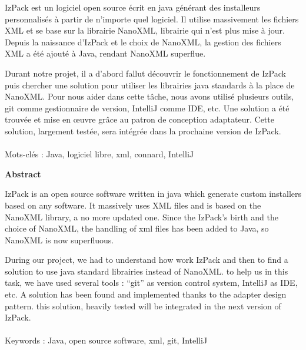 IzPack est un logiciel open source écrit en java générant des installeurs personnalisés à partir de n'importe quel logiciel.
Il utilise massivement les fichiers XML et se base sur la librairie NanoXML, librairie qui n'est plus mise à jour.
Depuis la naissance d'IzPack et le choix de NanoXML, la gestion des fichiers XML a été ajouté à Java, rendant NanoXML superflue.

Durant notre projet, il a d'abord fallut découvrir le fonctionnement de IzPack puis chercher une solution pour utiliser les librairies java standards à la place de NanoXML.
Pour nous aider dans cette tâche, nous avons utilisé plusieurs outils, git comme gestionnaire de version, IntelliJ comme IDE, etc.
Une solution a été trouvée et mise en \oe{}uvre grâce au patron de conception adaptateur.
Cette solution, largement testée, sera intégrée dans la prochaine version de IzPack.
~\\
~\\
Mots-clés : Java, logiciel libre, xml, connard, IntelliJ
\vfill
\begin{center}\large{\textbf{Abstract}}\end{center}

IzPack is an open source software written in java which generate custom installers based on any software.
It massively uses XML files and is based on the NanoXML library, a no more updated one.
Since the IzPack's birth and the choice of NanoXML, the handling of xml files has been added to Java, so NanoXML is now superfluous.

During our project, we had to understand how work IzPack and then to find a solution to use java standard librairies instead of NanoXML.
to help us in this task, we have used several tools : ``git'' as version control system, IntelliJ as IDE, etc.
A solution has been found and implemented thanks to the adapter design pattern.
this solution, heavily tested will be integrated in the next version of IzPack.
~\\
~\\
Keywords : Java, open source software, xml, git, IntelliJ